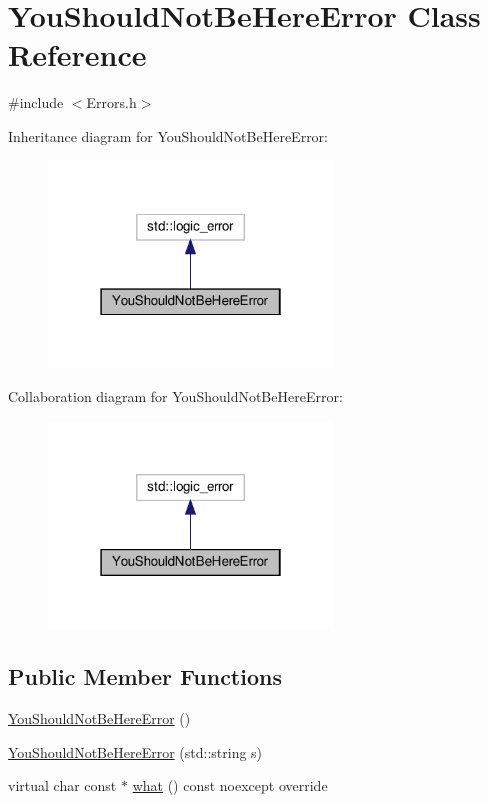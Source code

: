 \hypertarget{class_you_should_not_be_here_error}{}\section{You\+Should\+Not\+Be\+Here\+Error Class Reference}
\label{class_you_should_not_be_here_error}


{\ttfamily \#include $<$Errors.\+h$>$}



Inheritance diagram for You\+Should\+Not\+Be\+Here\+Error\+:\nopagebreak
\begin{figure}[H]
\begin{center}
\leavevmode
\includegraphics[width=214pt]{class_you_should_not_be_here_error__inherit__graph}
\end{center}
\end{figure}


Collaboration diagram for You\+Should\+Not\+Be\+Here\+Error\+:\nopagebreak
\begin{figure}[H]
\begin{center}
\leavevmode
\includegraphics[width=214pt]{class_you_should_not_be_here_error__coll__graph}
\end{center}
\end{figure}
\subsection*{Public Member Functions}
\begin{DoxyCompactItemize}
\item 
\hyperlink{class_you_should_not_be_here_error_a07ad83d10d42cb5edea6e0a16ffcd225}{You\+Should\+Not\+Be\+Here\+Error} ()
\item 
\hyperlink{class_you_should_not_be_here_error_ad4ccc32bd90603898ae927ef90b36651}{You\+Should\+Not\+Be\+Here\+Error} (std\+::string s)
\item 
virtual char const  $\ast$ \hyperlink{class_you_should_not_be_here_error_ae21a5eec0be24796dde99ca24fc7ade6}{what} () const noexcept override
\end{DoxyCompactItemize}



